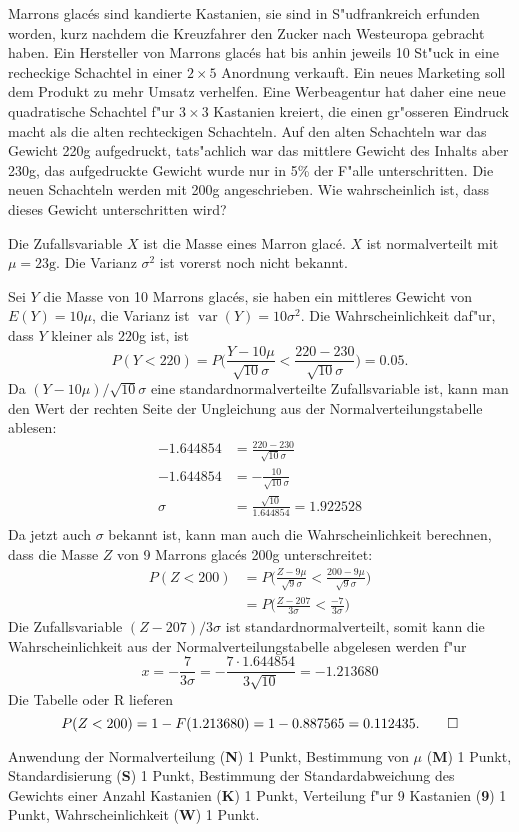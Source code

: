 Marrons glac\'es sind kandierte Kastanien, sie sind in S"udfrankreich
erfunden worden, kurz nachdem die Kreuzfahrer den Zucker nach Westeuropa
gebracht haben. Ein Hersteller von Marrons glac\'es hat bis anhin
jeweils 10 St"uck in eine recheckige Schachtel in einer $2\times 5$
Anordnung verkauft. Ein neues Marketing soll dem Produkt zu mehr
Umsatz verhelfen. Eine Werbeagentur hat daher eine neue quadratische Schachtel 
f"ur $3\times 3$ Kastanien kreiert, die einen gr"osseren Eindruck
macht als die alten rechteckigen Schachteln. Auf den alten Schachteln
war das Gewicht 220g aufgedruckt, tats"achlich war das mittlere
Gewicht des Inhalts aber 230g, das aufgedruckte Gewicht wurde
nur in 5\% der F"alle unterschritten. Die neuen Schachteln werden mit
200g angeschrieben. Wie wahrscheinlich ist, dass dieses Gewicht unterschritten
wird?

\begin{loesung}
Die Zufallsvariable $X$ ist die Masse eines Marron glac\'e. $X$ ist
normalverteilt mit $\mu = 23\text{g}$. Die Varianz $\sigma^2$ ist vorerst
noch nicht bekannt.

Sei $Y$ die Masse von 10 Marrons glac\'es, sie haben ein mittleres Gewicht von
$E(Y)=10\mu$, die Varianz ist $\operatorname{var}(Y)=10\sigma^2$.
Die Wahrscheinlichkeit daf"ur, dass $Y$ kleiner als $220$g ist, ist
\[
P(Y<220)=P\biggl(\frac{Y-10\mu}{\sqrt{10}\sigma}<\frac{220-230}{\sqrt{10}\sigma}\biggr)=0.05.
\]
Da $(Y-10\mu)/\sqrt{10}\sigma$ eine standardnormalverteilte Zufallsvariable
ist, kann man den Wert der rechten Seite der Ungleichung aus der
Normalverteilungstabelle ablesen:
\begin{align*}
-1.644854&= \frac{220-230}{\sqrt{10}\sigma}\\
-1.644854&= -\frac{10}{\sqrt{10}\sigma}\\
\sigma &= \frac{\sqrt{10}}{1.644854}=1.922528\\
\end{align*}
Da jetzt auch $\sigma$ bekannt ist, kann man auch die Wahrscheinlichkeit
berechnen, dass die Masse $Z$ von 9 Marrons glac\'es 200g unterschreitet:
\begin{align*}
P(Z<200)
&=
P\biggl(\frac{Z-9\mu}{\sqrt{9}\sigma}<\frac{200-9\mu}{\sqrt{9}\sigma} \biggr)
\\
&=
P\biggl(\frac{Z-207}{3\sigma}<\frac{-7}{3\sigma} \biggr)
\end{align*}
Die Zufallsvariable $(Z-207)/3\sigma$ ist standardnormalverteilt, somit
kann die Wahrscheinlichkeit aus der Normalverteilungstabelle abgelesen
werden f"ur
\[
x=-\frac{7}{3\sigma}=-\frac{7\cdot1.644854}{3\sqrt{10}}=-1.213680
\]
Die Tabelle oder R lieferen
\[
P(Z<200)=1-F(1.213680)=1-0.887565=0.112435.
\qedhere
\]
\end{loesung}


\begin{bewertung}
Anwendung der Normalverteilung ({\bf N}) 1 Punkt,
Bestimmung von $\mu$ ({\bf M}) 1 Punkt,
Standardisierung ({\bf S}) 1 Punkt,
Bestimmung der Standardabweichung des Gewichts einer Anzahl Kastanien ({\bf K}) 1 Punkt,
Verteilung f"ur 9 Kastanien ({\bf 9}) 1 Punkt,
Wahrscheinlichkeit ({\bf W}) 1 Punkt.
\end{bewertung}



